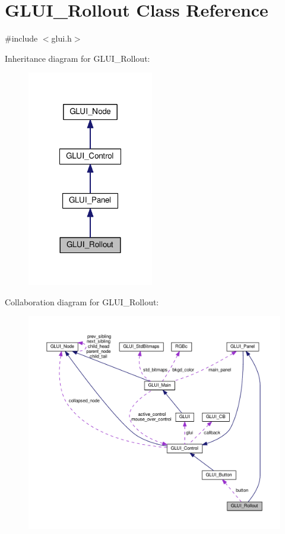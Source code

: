 \hypertarget{class_g_l_u_i___rollout}{\section{G\+L\+U\+I\+\_\+\+Rollout Class Reference}
\label{class_g_l_u_i___rollout}
}


{\ttfamily \#include $<$glui.\+h$>$}



Inheritance diagram for G\+L\+U\+I\+\_\+\+Rollout\+:\nopagebreak
\begin{figure}[H]
\begin{center}
\leavevmode
\includegraphics[width=156pt]{class_g_l_u_i___rollout__inherit__graph}
\end{center}
\end{figure}


Collaboration diagram for G\+L\+U\+I\+\_\+\+Rollout\+:\nopagebreak
\begin{figure}[H]
\begin{center}
\leavevmode
\includegraphics[width=350pt]{class_g_l_u_i___rollout__coll__graph}
\end{center}
\end{figure}
